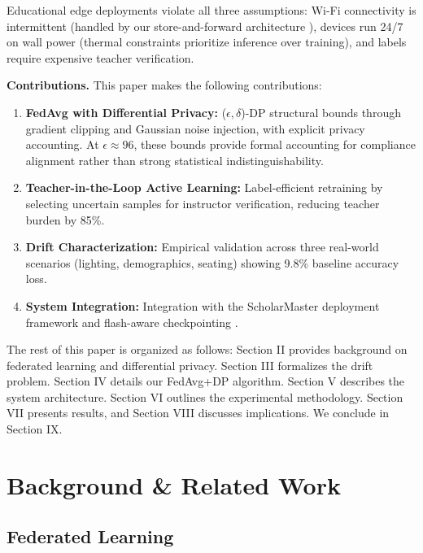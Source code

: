 \documentclass[conference]{IEEEtran}
\begin{document}
Educational edge deployments violate all three assumptions: Wi-Fi connectivity is intermittent (handled by our store-and-forward architecture \cite{b1}), devices run 24/7 on wall power (thermal constraints prioritize inference over training), and labels require expensive teacher verification.

\textbf{Contributions.} This paper makes the following contributions:

\begin{enumerate}
    \item \textbf{FedAvg with Differential Privacy:} ($\epsilon, \delta$)-DP structural bounds through gradient clipping and Gaussian noise injection, with explicit privacy accounting. At $\epsilon \approx 96$, these bounds provide formal accounting for compliance alignment rather than strong statistical indistinguishability.
    \item \textbf{Teacher-in-the-Loop Active Learning:} Label-efficient retraining by selecting uncertain samples for instructor verification, reducing teacher burden by 85\%.
    \item \textbf{Drift Characterization:} Empirical validation across three real-world scenarios (lighting, demographics, seating) showing 9.8\% baseline accuracy loss.
    \item \textbf{System Integration:} Integration with the ScholarMaster deployment framework \cite{b1} and flash-aware checkpointing \cite{b9}.
\end{enumerate}

The rest of this paper is organized as follows: Section II provides background on federated learning and differential privacy. Section III formalizes the drift problem. Section IV details our FedAvg+DP algorithm. Section V describes the system architecture. Section VI outlines the experimental methodology. Section VII presents results, and Section VIII discusses implications. We conclude in Section IX.

\section{Background \& Related Work}

\subsection{Federated Learning}
\end{document}
